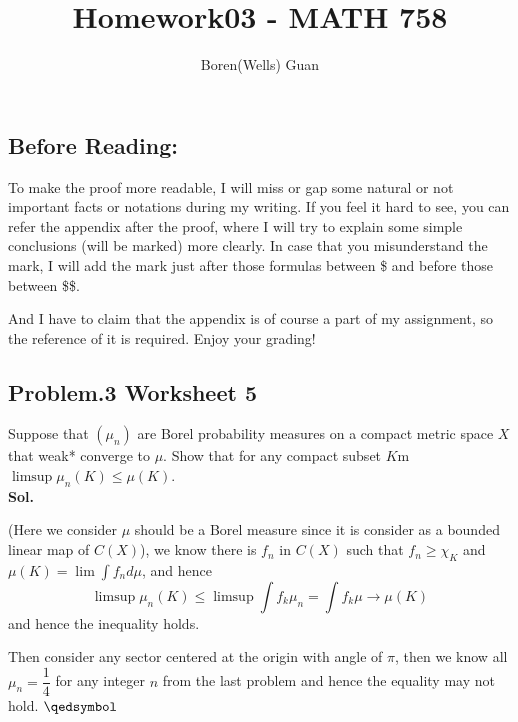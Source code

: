 \documentclass[lang=en,11pt,a4paper,citestyle =authoryear]{elegantpaper}
\title{Homework03 - MATH 758}
\author{Boren(Wells) Guan}
\newcommand{\prvd}{$\hfill \qedsymbol$}
\begin{document}
\maketitle

\subsection*{Before Reading:}\par
To make the proof more readable, I will miss or gap some natural or not important facts or notations during my writing. If you feel it hard to see, you can refer the appendix after the proof, where I will try to explain some simple conclusions (will be marked) more clearly. In case that you misunderstand the mark, I will add the mark just after those formulas between \$ and before those between \$\$.\par
And I have to claim that the appendix is of course a part of my assignment, so the reference of it is required. Enjoy your grading!

\subsection*{Problem.3 Worksheet 5} 
Suppose that $(\mu_n)$ are Borel probability measures on a compact metric space $X$ that weak* converge to $\mu$. Show that for any compact subset $K$m $\limsup \mu_n(K) \leq \mu(K)$.
\vspace{0.5em}\\
\textbf{Sol.} \par
(Here we consider $\mu$ should be a Borel measure since it is consider as a bounded linear map of $C(X)$), we know there is $f_n$ in $C(X)$ such that $f_n\geq \chi_K$ and $\mu(K) = \lim \int f_n d\mu$, and hence
\[
\limsup \mu_n(K) \leq \limsup \int f_k \mu_n = \int f_k \mu \to \mu(K)
\]
and hence the inequality holds.\par
Then consider any sector centered at the origin with angle of $\pi$, then we know all $\mu_n = \dfrac{1}{4}$ for any integer $n$ from the last problem and hence the equality may not hold.
\prvd
\vspace{0.5em}
\end{document}

